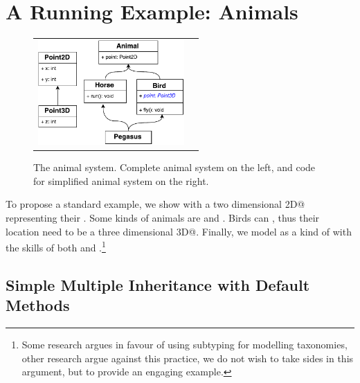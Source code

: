 \section{A Running Example: Animals}\label{sec:ep}

\begin{figure}
\begin{tabular}{l|l}
\includegraphics[height=4cm]{PegasusDetail.pdf}\hspace{20pt} &
\begin{minipage}{8cm}
\vspace{-90pt}
\end{minipage}
\end{tabular}
\caption{The animal system. Complete animal system on the left, and code for simplified animal system on the right. }\label{fig:pegasus}
\end{figure}

To propose a standard example, we show \Q@Animal@s with a two dimensional \Q@Point2D@ representing their \Q@location@.
Some kinds of animals are \Q@Horse@s and \Q@Bird@s.
Birds can \Q@fly@, thus their location need to be a three dimensional \Q@Point3D@.
Finally, we model \Q@Pegasus@ as a kind of \Q@Animal@ with the skills of both \Q@Horse@s and \Q@Bird@s.\footnote{
Some research argues in favour of using subtyping for modelling taxonomies, other research argue against this practice, we do not wish to take sides in this argument, but to provide an engaging example.}

\subsection{Simple Multiple Inheritance with Default Methods}

